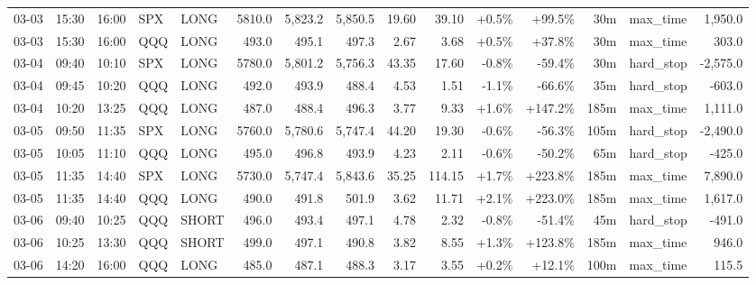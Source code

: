 \documentclass[11pt,a4paper,twoside]{article}
\begin{document}
\begin{landscape}
\begin{center}
\begin{longtable}{>{\color{txtmain}}l l l l l r r r r r r r r >{\color{txtmain}}l r}
03-03 & 15:30 & 16:00 & SPX & LONG & 5810.0 & 5,823.2 & 5,850.5 & 19.60 & 39.10 & \textcolor{wingreen}{+0.5\%} & \textcolor{wingreen}{+99.5\%} & 30m & max\_time & \textcolor{wingreen}{1,950.0} \\
03-03 & 15:30 & 16:00 & QQQ & LONG & 493.0 & 495.1 & 497.3 & 2.67 & 3.68 & \textcolor{wingreen}{+0.5\%} & \textcolor{wingreen}{+37.8\%} & 30m & max\_time & \textcolor{wingreen}{303.0} \\
03-04 & 09:40 & 10:10 & SPX & LONG & 5780.0 & 5,801.2 & 5,756.3 & 43.35 & 17.60 & \textcolor{lossred}{-0.8\%} & \textcolor{lossred}{-59.4\%} & 30m & hard\_stop & \textcolor{lossred}{-2,575.0} \\
03-04 & 09:45 & 10:20 & QQQ & LONG & 492.0 & 493.9 & 488.4 & 4.53 & 1.51 & \textcolor{lossred}{-1.1\%} & \textcolor{lossred}{-66.6\%} & 35m & hard\_stop & \textcolor{lossred}{-603.0} \\
03-04 & 10:20 & 13:25 & QQQ & LONG & 487.0 & 488.4 & 496.3 & 3.77 & 9.33 & \textcolor{wingreen}{+1.6\%} & \textcolor{wingreen}{+147.2\%} & 185m & max\_time & \textcolor{wingreen}{1,111.0} \\
03-05 & 09:50 & 11:35 & SPX & LONG & 5760.0 & 5,780.6 & 5,747.4 & 44.20 & 19.30 & \textcolor{lossred}{-0.6\%} & \textcolor{lossred}{-56.3\%} & 105m & hard\_stop & \textcolor{lossred}{-2,490.0} \\
03-05 & 10:05 & 11:10 & QQQ & LONG & 495.0 & 496.8 & 493.9 & 4.23 & 2.11 & \textcolor{lossred}{-0.6\%} & \textcolor{lossred}{-50.2\%} & 65m & hard\_stop & \textcolor{lossred}{-425.0} \\
03-05 & 11:35 & 14:40 & SPX & LONG & 5730.0 & 5,747.4 & 5,843.6 & 35.25 & 114.15 & \textcolor{wingreen}{+1.7\%} & \textcolor{wingreen}{+223.8\%} & 185m & max\_time & \textcolor{wingreen}{7,890.0} \\
03-05 & 11:35 & 14:40 & QQQ & LONG & 490.0 & 491.8 & 501.9 & 3.62 & 11.71 & \textcolor{wingreen}{+2.1\%} & \textcolor{wingreen}{+223.0\%} & 185m & max\_time & \textcolor{wingreen}{1,617.0} \\
03-06 & 09:40 & 10:25 & QQQ & SHORT & 496.0 & 493.4 & 497.1 & 4.78 & 2.32 & \textcolor{lossred}{-0.8\%} & \textcolor{lossred}{-51.4\%} & 45m & hard\_stop & \textcolor{lossred}{-491.0} \\
03-06 & 10:25 & 13:30 & QQQ & SHORT & 499.0 & 497.1 & 490.8 & 3.82 & 8.55 & \textcolor{wingreen}{+1.3\%} & \textcolor{wingreen}{+123.8\%} & 185m & max\_time & \textcolor{wingreen}{946.0} \\
03-06 & 14:20 & 16:00 & QQQ & LONG & 485.0 & 487.1 & 488.3 & 3.17 & 3.55 & \textcolor{wingreen}{+0.2\%} & \textcolor{wingreen}{+12.1\%} & 100m & max\_time & \textcolor{wingreen}{115.5} \\

\end{longtable}
\end{center}
\end{landscape}
\end{document}
